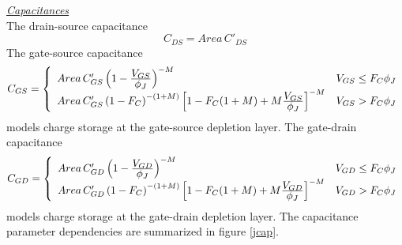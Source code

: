 \underline{\sl\large Capacitances}\\[0.1in]
The drain-source capacitance
\begin{equation}
C_{DS} = Area\,C'_{DS}
\end{equation}
The gate-source capacitance
\begin{equation}
C_{GS} = \left\{ \begin{array}{ll}
         Area\,C'_{GS}\left(1 - {{\textstyle V_{GS}}\over{\textstyle \phi_J}}
         \right)^{-M}
         & V_{GS} \le F_C \phi_J\\
         Area\,C'_{GS}\left(1 -F_C\right)^{-(1+M)}
         \left[1-F_C(1+M)+M {{\textstyle V_{GS}}\over{\textstyle \phi_J}}
         \right]^{-M}
         & V_{GS} > F_C \phi_J
         \end{array} \right. %
\end{equation}
models charge storage at the gate-source depletion layer.
The gate-drain capacitance
\begin{equation}
C_{GD} = \left\{ \begin{array}{ll}
         Area\,C'_{GD}\left(1 - {{\textstyle V_{GD}}\over{\textstyle \phi_J}}
         \right)^{-M}
         & V_{GD} \le F_C \phi_J\\
         Area\,C'_{GD}\left(1 -F_C\right)^{-(1+M)}
         \left[1-F_C(1+M)+M {{\textstyle V_{GD}}\over{\textstyle \phi_J}}
         \right]^{-M}
         & V_{GD} > F_C \phi_J
         \end{array} \right. %
\end{equation}
models charge storage at the gate-drain depletion layer.
The capacitance parameter dependencies are summarized in figure
\ref{jcap}.\\[0.2in]
